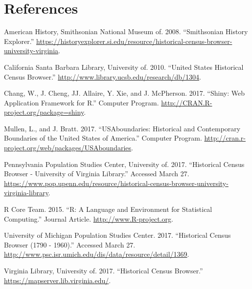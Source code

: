 \documentclass[11pt,]{article}
\begin{document}
\section{References}

\hypertarget{refs}{}
\hypertarget{ref-SmithsonianHistoryExplorer}{}
American History, Smithsonian National Museum of. 2008. ``Smithsonian
History Explorer.''
\url{https://historyexplorer.si.edu/resource/historical-census-browser-university-virginia}.

\hypertarget{ref-UCSB-US-HCB}{}
California Santa Barbara Library, University of. 2010. ``United States
Historical Census Browser.''
\url{http://www.library.ucsb.edu/research/db/1304}.

\hypertarget{ref-Shiny}{}
Chang, W., J. Cheng, JJ. Allaire, Y. Xie, and J. McPherson. 2017.
``Shiny: Web Application Framework for R.'' Computer Program.
\url{http://CRAN.R-project.org/package=shiny}.

\hypertarget{ref-USAboundaries}{}
Mullen, L., and J. Bratt. 2017. ``USAboundaries: Historical and
Contemporary Boundaries of the United States of America.'' Computer
Program. \url{http://cran.r-project.org/web/packages/USAboundaries}.

\hypertarget{ref-UPenn-HCB}{}
Pennsylvania Population Studies Center, University of. 2017.
``Historical Census Browser - University of Virginia Library.'' Accessed
March 27.
\url{https://www.pop.upenn.edu/resource/historical-census-browser-university-virginia-library}.

\hypertarget{ref-RCoreTeam}{}
R Core Team. 2015. ``R: A Language and Environment for Statistical
Computing.'' Journal Article. \url{http://www.R-project.org}.

\hypertarget{ref-UMich-HCB}{}
University of Michigan Population Studies Center. 2017. ``Historical
Census Browser (1790 - 1960).'' Accessed March 27.
\url{http://www.psc.isr.umich.edu/dis/data/resource/detail/1369}.

\hypertarget{ref-HCB}{}
Virginia Library, University of. 2017. ``Historical Census Browser.''
\url{https://mapserver.lib.virginia.edu/}.
\end{document}
